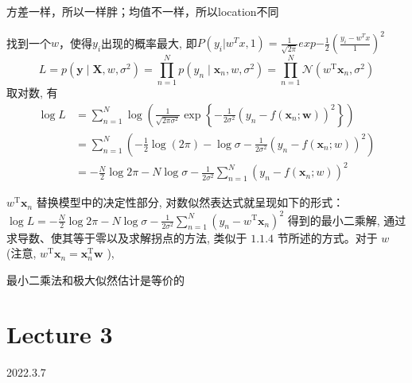 \documentclass[UTF8]{ctexart}
\numberwithin{equation}{section}
\begin{document}
方差一样，所以一样胖；均值不一样，所以location不同

找到一个$w$，使得$y_i$出现的概率最大, 即$P(y_i|w^Tx,1)=\frac{1}{\sqrt{2\pi}}exp{-\frac{1}{2}(\frac{y_i-w^Tx}{1})^2}$
\begin{equation*}
    L=p\left(\boldsymbol{y} \mid \boldsymbol{X}, w, \sigma^{2}\right)=\prod_{n=1}^{N} p\left(y_{n} \mid \boldsymbol{x}_{n}, w, \sigma^{2}\right)=\prod_{n=1}^{N} \mathcal{N}\left(w^{\mathrm{T}} \boldsymbol{x}_{n}, \sigma^{2}\right)
\end{equation*}
取对数, 有 
\begin{equation*}
    \begin{aligned}
        \log L &=\sum_{n=1}^{N} \log \left(\frac{1}{\sqrt{2 \pi \sigma^{2}}} \exp \left\{-\frac{1}{2 \sigma^{2}}\left(y_{n}-f\left(\boldsymbol{x}_{n} ; \boldsymbol{w}\right)\right)^{2}\right\}\right) \\
        &=\sum_{n=1}^{N}\left(-\frac{1}{2} \log (2 \pi)-\log \sigma-\frac{1}{2 \sigma^{2}}\left(y_{n}-f\left(\boldsymbol{x}_{n} ; w\right)\right)^{2}\right) \\
        &=-\frac{N}{2} \log 2 \pi-N \log \sigma-\frac{1}{2 \sigma^{2}} \sum_{n=1}^{N}\left(y_{n}-f\left(\boldsymbol{x}_{n} ; w\right)\right)^{2}
    \end{aligned}
\end{equation*}

$w^{\mathrm{T}} \boldsymbol{x}_{n}$ 替换模型中的决定性部分, 对数似然表达式就呈现如下的形式： $\log L=-\frac{N}{2} \log 2 \pi-N \log \sigma-\frac{1}{2 \sigma^{2}} \sum_{n=1}^{N}\left(y_{n}-w^{\mathrm{T}} \boldsymbol{x}_{n}\right)^{2}$
得到的最小二乘解, 通过求导数、使其等于零以及求解拐点的方法, 类似于 $1.1 .4$ 节所述的方式。对于 $w$ (注意, $w^{\mathrm{T}} \boldsymbol{x}_{n}=\boldsymbol{x}_{n}^{\mathrm{T}} \boldsymbol{w}$ ),

最小二乘法和极大似然估计是等价的
\newpage

\section{Lecture 3}
2022.3.7
\end{document}
